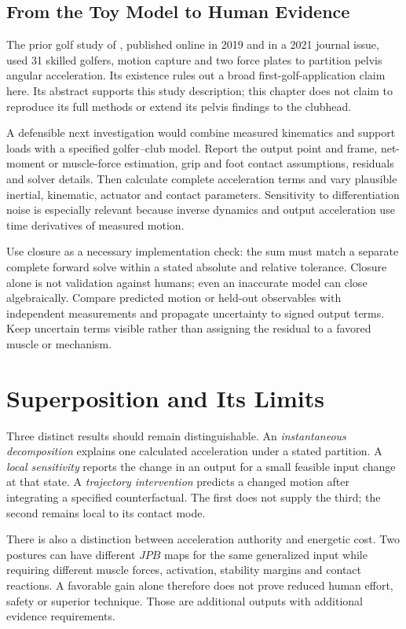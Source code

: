 \subsection{From the Toy Model to Human Evidence}
The prior golf study of \citep{Takagi2021pelvis}, published online in 2019 and in a 2021 journal issue, used 31 skilled golfers, motion capture and two force plates to partition pelvis angular acceleration. Its existence rules out a broad first-golf-application claim here. Its abstract supports this study description; this chapter does not claim to reproduce its full methods or extend its pelvis findings to the clubhead.

A defensible next investigation would combine measured kinematics and support loads with a specified golfer--club model. Report the output point and frame, net-moment or muscle-force estimation, grip and foot contact assumptions, residuals and solver details. Then calculate complete acceleration terms and vary plausible inertial, kinematic, actuator and contact parameters. Sensitivity to differentiation noise is especially relevant because inverse dynamics and output acceleration use time derivatives of measured motion.

Use closure as a necessary implementation check: the sum must match a separate complete forward solve within a stated absolute and relative tolerance. Closure alone is not validation against humans; even an inaccurate model can close algebraically. Compare predicted motion or held-out observables with independent measurements and propagate uncertainty to signed output terms. Keep uncertain terms visible rather than assigning the residual to a favored muscle or mechanism.

\section{Superposition and Its Limits}
\label{sec:superposition_limits}
Three distinct results should remain distinguishable. An \emph{instantaneous decomposition} explains one calculated acceleration under a stated partition. A \emph{local sensitivity} reports the change in an output for a small feasible input change at that state. A \emph{trajectory intervention} predicts a changed motion after integrating a specified counterfactual. The first does not supply the third; the second remains local to its contact mode.

There is also a distinction between acceleration authority and energetic cost. Two postures can have different \(JPB\) maps for the same generalized input while requiring different muscle forces, activation, stability margins and contact reactions. A favorable gain alone therefore does not prove reduced human effort, safety or superior technique. Those are additional outputs with additional evidence requirements.

